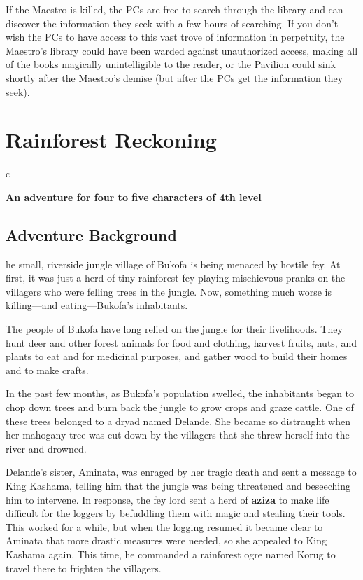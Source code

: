 \documentclass[10pt,a4paper,twoside,bg=print,twocolumn,openany,nodeprecatedcode]{dndbook}
\begin{document}
If the Maestro is killed, the PCs are free to search through the library and can discover the information they seek with a few hours of searching. If you don't wish the PCs to have access to this vast trove of information in perpetuity, the Maestro's library could have been warded against unauthorized access, making all of the books magically unintelligible to the reader, or the Pavilion could sink shortly after the Maestro's demise (but after the PCs get the information they seek).

\chapter{Rainforest Reckoning}

\begin{DndTable}{c}

\textbf{An adventure for four to five characters of 4th level}\\
\end{DndTable}

\section{Adventure Background}
he small, riverside jungle village of Bukofa is being menaced by hostile fey. At first, it was just a herd of tiny rainforest fey playing mischievous pranks on the villagers who were felling trees in the jungle. Now, something much worse is killing—and eating—Bukofa's inhabitants.


The people of Bukofa have long relied on the jungle for their livelihoods. They hunt deer and other forest animals for food and clothing, harvest fruits, nuts, and plants to eat and for medicinal purposes, and gather wood to build their homes and to make crafts.

In the past few months, as Bukofa's population swelled, the inhabitants began to chop down trees and burn back the jungle to grow crops and graze cattle. One of these trees belonged to a dryad named Delande. She became so distraught when her mahogany tree was cut down by the villagers that she threw herself into the river and drowned.

Delande's sister, Aminata, was enraged by her tragic death and sent a message to King Kashama, telling him that the jungle was being threatened and beseeching him to intervene. In response, the fey lord sent a herd of \textbf{aziza} to make life difficult for the loggers by befuddling them with magic and stealing their tools. This worked for a while, but when the logging resumed it became clear to Aminata that more drastic measures were needed, so she appealed to King Kashama again. This time, he commanded a rainforest ogre named Korug to travel there to frighten the villagers.
\end{document}
